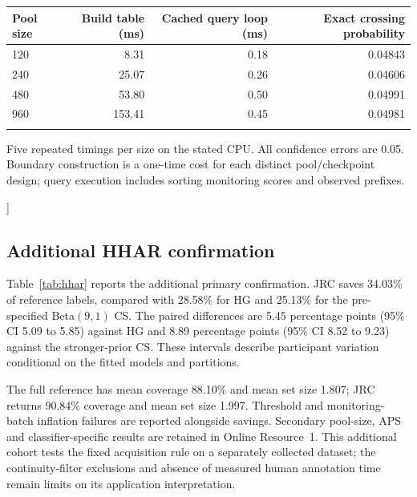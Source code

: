 \documentclass[pdflatex,sn-basic,Numbered,iicol]{sn-jnl}
\begin{document}
{\begin{minipage}{\textwidth}
\begin{minipage}{\textwidth}
\begin{tabular}{lrrr}
\toprule
Pool size & Build table (ms) & Cached query loop (ms) & Exact crossing probability \\
\midrule
120 & 8.31 & 0.18 & 0.04843 \\
240 & 25.07 & 0.26 & 0.04606 \\
480 & 53.80 & 0.50 & 0.04991 \\
960 & 153.41 & 0.45 & 0.04981 \\
\botrule
\end{tabular}
\begin{minipage}{\textwidth}\footnotesize Five repeated timings per size on the stated CPU. All confidence errors are 0.05. Boundary construction is a one-time cost for each distinct pool/checkpoint design; query execution includes sorting monitoring scores and observed prefixes.\end{minipage}
\end{minipage}
\par\vspace{16pt}\end{minipage}
}]
\subsection{Additional HHAR confirmation}
Table~\ref{tab:hhar} reports the additional primary confirmation. JRC saves 34.03\% of reference labels, compared with 28.58\% for HG and 25.13\% for the pre-specified Beta$(9,1)$ CS. The paired differences are 5.45 percentage points (95\% CI 5.09 to 5.85) against HG and 8.89 percentage points (95\% CI 8.52 to 9.23) against the stronger-prior CS. These intervals describe participant variation conditional on the fitted models and partitions.

The full reference has mean coverage 88.10\% and mean set size 1.807; JRC returns 90.84\% coverage and mean set size 1.997. Threshold and monitoring-batch inflation failures are reported alongside savings. Secondary pool-size, APS and classifier-specific results are retained in Online Resource~1. This additional cohort tests the fixed acquisition rule on a separately collected dataset; the continuity-filter exclusions and absence of measured human annotation time remain limits on its application interpretation.
\end{document}
